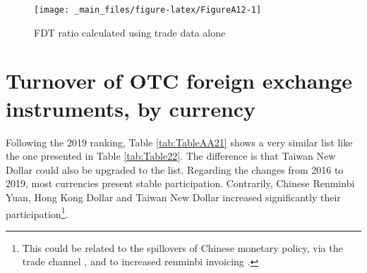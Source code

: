 \documentclass[a4paper, twoside]{templates/ociamthesis}
\begin{document}
\begin{figure}[!ht]

{\centering \texttt{[image: \_main\_files/figure-latex/FigureA12-1]} 

}

\caption{FDT ratio calculated using trade data alone}\label{fig:FigureA12}
\end{figure}

\clearpage

\hypertarget{appendixa2}{%
\section{Turnover of OTC foreign exchange instruments, by currency}\label{appendixa2}}

Following the 2019 ranking, Table \ref{tab:TableAA21} shows a very similar list like the one presented in Table \ref{tab:Table22}. The difference is that Taiwan New Dollar could also be upgraded to the list. Regarding the changes from 2016 to 2019, most currencies present stable participation. Contrarily, Chinese Renminbi Yuan, Hong Kong Dollar and Taiwan New Dollar increased significantly their participation\footnote{This could be related to the spillovers of Chinese monetary policy, via the trade channel \autocite{miranda-agrippino2020a}, and to increased renminbi invoicing \autocite{georgiadis2021}.}.
\end{document}
